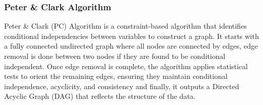 \documentclass[conference]{IEEEtran}
\begin{document}
\begin{table}[h!]
\centering
\label{tab:learning_summary}
\caption{Bayesian Search Learning Algorithm Parameters}
\renewcommand{\arraystretch}{1.3}
\end{table}

\subsubsection{Peter \& Clark Algorithm}
Peter \& Clark (PC) Algorithm is a constraint-based algorithm that identifies conditional independencies between variables to construct a graph. It starts with a fully connected undirected graph where all nodes are connected by edges, edge removal is done between two nodes if they are found to be conditional independent. Once edge removal is complete, the algorithm applies statistical tests to orient the remaining edges, ensuring they maintain conditional independence, acyclicity, and consistency and finally, it outputs a Directed Acyclic Graph (DAG) that reflects the structure of the data.
\end{document}
